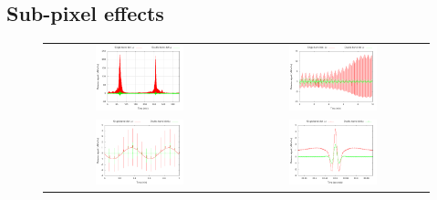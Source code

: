 \documentclass{article}
\begin{document}
\subsection{Sub-pixel effects}
\begin{figure}
	\centering
	\begin{tabular}{cc}
		\includegraphics[width=0.48\textwidth,trim=8mm 0 0mm 0mm]{plots/tod000_full.png} &
		\includegraphics[width=0.48\textwidth,trim=8mm 0 0mm 0mm]{plots/tod000_10min.png} \\
		\includegraphics[width=0.48\textwidth,trim=8mm 0 0mm 0mm]{plots/tod000_1min.png} &
		\includegraphics[width=0.48\textwidth,trim=8mm 0 0mm 0mm]{plots/tod000_stroke.png}

\end{tabular}
\end{figure}
\end{document}

